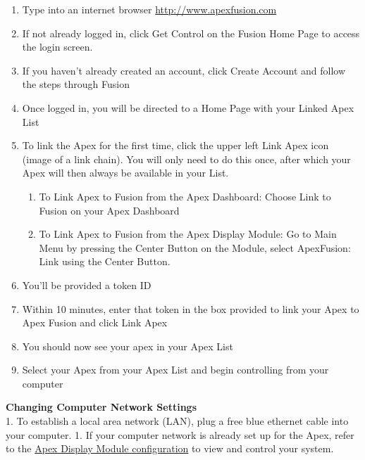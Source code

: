 \documentclass[
]{book}
\providecommand{\tightlist}{%
  \setlength{\itemsep}{0pt}\setlength{\parskip}{0pt}}
\begin{document}
\begin{enumerate}
\def\labelenumi{\arabic{enumi}.}
\tightlist
\item
  Type into an internet browser \href{apexfusion.com}{http://www.apexfusion.com}\\
\item
  If not already logged in, click Get Control on the Fusion Home Page to access the login screen.\\
\item
  If you haven't already created an account, click Create Account and follow the steps through Fusion\\
\item
  Once logged in, you will be directed to a Home Page with your Linked Apex List\\
\item
  To link the Apex for the first time, click the upper left Link Apex icon (image of a link chain). You will only need to do this once, after which your Apex will then always be available in your List.

  \begin{enumerate}
  \def\labelenumii{\arabic{enumii}.}
  \tightlist
  \item
    To Link Apex to Fusion from the Apex Dashboard: Choose Link to Fusion on your Apex Dashboard\\
  \item
    To Link Apex to Fusion from the Apex Display Module: Go to Main Menu by pressing the Center Button on the Module, select ApexFusion: Link using the Center Button.\\
  \end{enumerate}
\item
  You'll be provided a token ID\\
\item
  Within 10 minutes, enter that token in the box provided to link your Apex to Apex Fusion and click Link Apex\\
\item
  You should now see your apex in your Apex List\\
\item
  Select your Apex from your Apex List and begin controlling from your computer
\end{enumerate}

\textbf{Changing Computer Network Settings}\\
1. To establish a local area network (LAN), plug a free blue ethernet cable into your computer.
1. If your computer network is already set up for the Apex, refer to the \protect\hyperlink{apex_display_configuration}{Apex Display Module configuration} to view and control your system.
\end{document}
